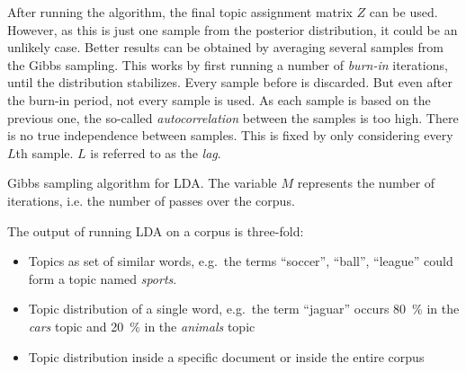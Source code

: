 \documentclass[
        a4paper,
        titlepage,
        twoside,
        parskip
        ]{scrbook}
\theoremstyle{break}
\begin{document}
After running the algorithm, the final topic assignment matrix $Z$ can be used.
However, as this is just one sample from the posterior distribution, it could be an unlikely case.
Better results can be obtained by averaging several samples from the Gibbs sampling.
This works by first running a number of \emph{burn-in} iterations, until the distribution stabilizes.
Every sample before is discarded.
But even after the burn-in period, not every sample is used.
As each sample is based on the previous one, the so-called \emph{autocorrelation} between the samples is too high.
There is no true independence between samples.
This is fixed by only considering every $L$th sample.
$L$ is referred to as the \emph{lag}.

\begin{algorithm}
  \caption{Gibbs sampling algorithm for LDA. The variable $M$ represents the number of iterations, i.e. the number of passes over the corpus.}
  \label{alg:gibbs_sampling}
  \begin{algorithmic}[1]
        \EndFor
      \EndFor
    \EndFor
    \EndProcedure
  \end{algorithmic}
\end{algorithm}
\label{sec:lda}

The output of running LDA on a corpus is three-fold:
\begin{itemize}
       \item Topics as set of similar words, e.g.\ the terms ``soccer'', ``ball'', ``league'' could form a topic named \emph{sports}.
       \item Topic distribution of a single word, e.g.\ the term ``jaguar'' occurs 80~\% in the \emph{cars} topic and 20~\% in the \emph{animals} topic
       \item Topic distribution inside a specific document or inside the entire corpus
\end{itemize}
\end{document}

